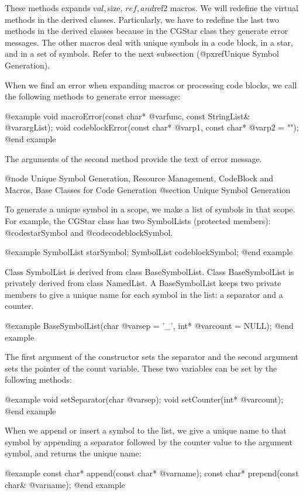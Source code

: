 These methods expands $val, $size, $ref, and $ref2 macros. We will redefine
the virtual methods in the derived classes. Particularly, we have to redefine
the last two methods in the derived classes because in the CGStar class they
generate error messages. The other macros deal with unique symbols in a
code block, in a star, and in a set of symbols. Refer to the next subsection
(@pxref{Unique Symbol Generation}).

When we find an error when expanding macros or processing code blocks, we
call the following methods to generate error message:

@example
void macroError(const char* @var{func}, const StringList& @var{argList});
void codeblockError(const char* @var{p1},  const char* @var{p2} = "");
@end example

The arguments of the second method provide the text of error message.

@node Unique Symbol Generation, Resource Management, CodeBlock and Macros, Base Classes for Code Generation
@section Unique Symbol Generation

To generate a unique symbol in a scope, we make a list of symbols in that
scope. For example, the CGStar class has two SymbolLists (protected
members): @code{starSymbol} and @code{codeblockSymbol}. 

@example
SymbolList starSymbol;
SymbolList codeblockSymbol;
@end example

Class SymbolList is derived from class BaseSymbolList. Class BaseSymbolList
is privately derived from class NamedList.
A BaseSymbolList keeps two private  members to give a unique name for 
each symbol in the list: a separator and a counter.

@example
BaseSymbolList(char @var{sep} = '_', int* @var{count} = NULL);
@end example

The first argument of the constructor sets the separator and the second 
argument sets the pointer of the count variable. These two variables can be
set by the following methods:

@example
void setSeparator(char @var{sep});
void setCounter(int* @var{count});
@end example

When we append or insert a symbol to the list, we give a unique 
name to that symbol by appending a separator followed by the counter value
to the argument symbol, and returns the unique name:

@example
const char* append(const char* @var{name});
const char* prepend(const char& @var{name});
@end example

